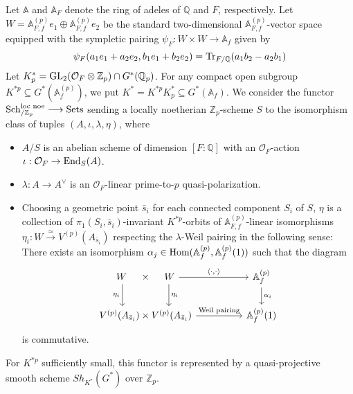 \documentclass{article}
\begin{document}
Let $\mathbb{A}$ and $\mathbb{A}_F$ denote the ring of adeles of $\mathbb{Q}$ and $F$, respectively. Let $W=\mathbb{A}_{F,f}^{(p)}e_1\oplus \mathbb{A}_{F,f}^{(p)}e_2$ be the standard two-dimensional $\mathbb{A}_{F,f}^{(p)}$-vector space equipped with the sympletic pairing $\psi_F:W\times W\rightarrow \mathbb{A}_f$ given by
\begin{equation}
	\psi_F(a_1e_1+a_2e_2,b_1e_1+b_2e_2)=\textnormal{Tr}_{F/\mathbb{Q}}(a_1b_2-a_2b_1)
\end{equation}
Let $K^\ast_p=\textnormal{GL}_2(\mathcal{O}_F\otimes \mathbb{Z}_p)\cap G^\ast(\mathbb{Q}_p)$. For any compact open subgroup $K^{\ast p}\subseteq G^\ast(\mathbb{A}_f^{(p)})$, we put $K^\ast=K^{\ast p}K^\ast_p\subseteq G^\ast(\mathbb{A}_f)$. We consider the functor $\textnormal{Sch}_{/\mathbb{Z}_p}^{\textnormal{loc noe}}\longrightarrow \textnormal{Sets}$ sending a locally noetherian $\mathbb{Z}_p$-scheme $S$ to the isomorphism class of tuples $(A,\iota,\lambda,\eta)$, where
\begin{itemize}
	\item $A/S$ is an abelian scheme of dimension $[F:\mathbb{Q}]$ with an $\mathcal{O}_F$-action $\iota:\mathcal{O}_F\to\textnormal{End}_S(A)$.
	\item $\lambda:A\to A^\vee$ is an $\mathcal{O}_F$-linear prime-to-$p$ quasi-polarization.
	\item Choosing a geometric point $\bar{s}_i$ for each connected component $S_i$ of $S$, $\eta$ is a collection of $\pi_1(S_i,\bar{s}_i)$-invariant $K^{\ast p}$-orbits of $\mathbb{A}_{F,f}^{(p)}$-linear isomorphisms $\eta_i:W\xrightarrow{\simeq} V^{(p)}(A_{\bar{s}_i})$ respecting the $\lambda$-Weil pairing in the following sense: There exists an isomorphism $\alpha_j\in \textnormal{Hom}(\mathbb{A}_f^{(p)},\mathbb{A}_f^{(p)}(1))$ such that the diagram 
\begin{equation}
	\begin{tikzcd}
		W\quad\ \times\quad\ W\arrow[rr, "{\langle\cdot,\cdot\rangle}"] \arrow[d, "\eta_i", shift left=10] \arrow[d, "\eta_i"', shift right=10] &  & {\mathbb{A}}_f^{(p)} \arrow[d, "\alpha_i"] \\
		V^{(p)}(A_{\bar{s}_i})\times V^{(p)}(A_{\bar{s}_i}) \arrow[rr, "\textnormal{Weil pairing}"]                                                                                    &  & {\mathbb{A}}_f^{(p)}(1)              
	\end{tikzcd}
\end{equation}
is commutative.
\end{itemize}
For $K^{\ast p}$ sufficiently small, this functor is represented by a quasi-projective smooth scheme $Sh_{K^\ast}(G^\ast)$ over $\mathbb{Z}_p$.
\end{document}
